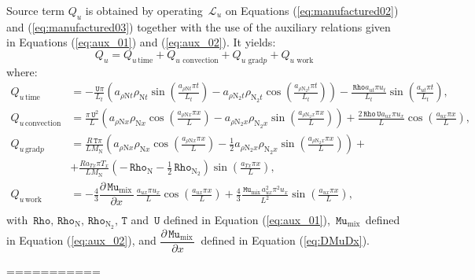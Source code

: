 \documentclass[10pt]{article}
\newcommand{\diff}[2] {\dfrac{\partial #1 }{\partial #2}}
\newcommand{\Lo}{\,\mathcal{L}}
\newcommand{\Rho}{\,\mathtt{Rho}}
\newcommand{\T}{\,\mathtt{T}}
\newcommand{\U}{\,\mathtt{U}}
\newcommand{\N}{\text{N}}
\newcommand{\Mu}{\, \mathtt{Mu}}
\newcommand{\mix}{\text{mix}\,}
\newcommand{\DMuDx}{\diff{\Mu_{\mix}}{x}\,}
\newcommand{\convection}{\,\text{convection}}
\newcommand{\gradp}{\,\text{grad}p}
\newcommand{\work}{\,\text{work}}
\begin{document}
Source term $Q_u$ is obtained by operating $\Lo_{u}$ on Equations  (\ref{eq:manufactured02}) and (\ref{eq:manufactured03})
together with the use of the  auxiliary relations given in Equations (\ref{eq:aux_01}) and (\ref{eq:aux_02}). It yields:
\begin{equation*}
 \label{eq:ns1d_12}
Q_u = Q_{u \, \text{time}}+Q_{u \, \convection}+Q_{u \, \gradp }+Q_{u \, \work }
\end{equation*}
where:
\begin{equation*}
\begin{split}
 Q_{u \,\text{time}} &= 
- \frac{\U \pi }{L_t}\left(a_{ \rho \N t} \rho_{\N t} \sin\left(\frac{a_{ \rho \N t} \pi t}{L_t}\right) - a_{ \rho \N_2 t}
\rho_{\N_2 t} \cos\left(\frac{a_{ \rho \N_2 t} \pi t}{L_t}\right)\right) - \frac{ \Rho a_{ut} \pi u_{t}
}{L_t}\sin\left(\frac{a_{ut} \pi t}{L_t}\right),\\
%
 Q_{u \convection} &= 
\frac{\pi \U^{2} }{L}\left(a_{ \rho \N x} \rho_{\N x} \cos\left(\frac{a_{ \rho \N x} \pi x}{L}\right) - a_{ \rho \N_2 x}
\rho_{\N_2 x} \sin\left(\frac{a_{ \rho \N_2 x} \pi x}{L}\right)\right) + \frac{2 \Rho \U a_{ux} \pi u_{x}
}{L}\cos\left(\frac{a_{ux} \pi x}{L}\right),\\
%
 Q_{u \gradp} &= 
\frac{R \T \pi }{L M_{\N}}\left(a_{ \rho \N x} \rho_{\N x} \cos\left(\frac{a_{ \rho \N x} \pi x}{L}\right) - \frac{1}{2} a_{ \rho
\N_2 x} \rho_{\N_2 x} \sin\left(\frac{a_{ \rho \N_2 x} \pi x}{L}\right)\right)+\\
%
& + \frac{R a_{Tx} \pi T_{x} }{L M_{\N}}\left(- \Rho_{\N} - \frac{1}{2} \Rho_{\N_2}\right) \sin\left(\frac{a_{Tx} \pi
x}{L}\right),\\
%
 Q_{u \work} &= 
- \frac{4}{3} \DMuDx \frac{ a_{ux} \pi u_{x} }{L} \cos\left(\frac{a_{ux} \pi x}{L}\right)+ \frac{4}{3} \frac{\Mu_{\mix} a_{ux}^{2}
\pi^{2} u_{x}}{L^{2}} \sin\left(\frac{a_{ux} \pi x}{L}\right),\\
%
\end{split}
\end{equation*}
with $\Rho,\Rho_\N, \Rho_{\N_2}, \T$ and $\U$ defined in Equation (\ref{eq:aux_01}), $\Mu_{\mix}$ defined in Equation
(\ref{eq:aux_02}), and $\DMuDx$ defined in Equation (\ref{eq:DMuDx}).


===========
\end{document}

